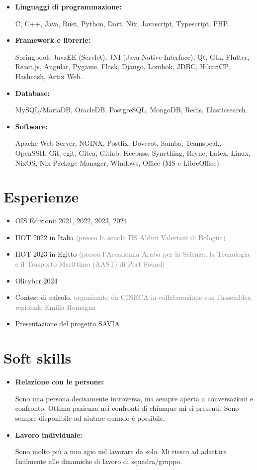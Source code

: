\documentclass{paper}
\begin{document}
\begin{itemize}
    \item \textbf{Linguaggi di programmazione:}

    C, C++, Java, Rust, Python, Dart, Nix, Javascript, Typescript, PHP.

    \item \textbf{Framework e librerie:}

    Springboot, JavaEE (Servlet), JNI (Java Native Interface), Qt, Gtk, Flutter, React.js, Angular, Pygame, Flask, Django, Lombok, JDBC, HikariCP, Hashcash, Actix Web.

    \item \textbf{Database:}

    MySQL/MariaDB, OracleDB, PostgreSQL, MongoDB, Redis, Elasticsearch.

    \item \textbf{Software:}

    Apache Web Server, NGINX, Postfix, Dovecot, Samba, Teamspeak, OpenSSH, Git, cgit, Gitea, Gitlab, Keepass, Syncthing, Rsync, Latex, Linux, NixOS, Nix Package Manager, Windows, Office (MS e LibreOffice).
\end{itemize}

\section{Esperienze}

\begin{itemize}
    \item OIS Edizioni: 2021, 2022, 2023, 2024
    \item IIOT 2022 in Italia \textcolor{gray}{(presso la scuola IIS Aldini Valeriani di Bologna)}
    \item IIOT 2023 in Egitto \textcolor{gray}{(presso l'Accademia Araba per la Scienza, la Tecnologia e il Trasporto Marittimo (AAST) di Port Fouad)}
    \item Olicyber 2024
    \item Contest di calcolo, \textcolor{gray}{organizzato da CINECA in collaborazione con l'assemblea regionale Emilia Romagna}
    \item Presentazione del progetto SAVIA
\end{itemize}

\section{Soft skills}

\begin{itemize}
    \item \textbf{Relazione con le persone:}

    Sono una persona decisamente introversa, ma sempre aperta a conversazioni e confronto.
    Ottima pazienza nei confronti di chiunque mi si presenti.
    Sono sempre disponibile ad aiutare quando è possibile.

    \item \textbf{Lavoro individuale:}

    Sono molto più a mio agio nel lavorare da solo.
    Mi riesco ad adattare facilmente alle dinamiche di lavoro di squadra/gruppo.
\end{itemize}
\end{document}
